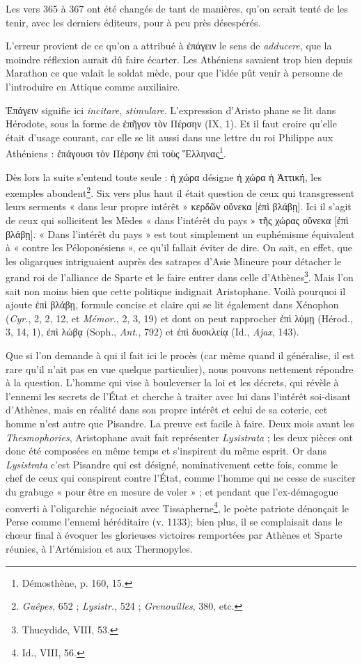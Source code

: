 \documentclass{book}%
\newcommand{\italique}[1]{\textit{#1}}%
\newcommand{\note}[1]{\footnote{#1}}
\begin{document}
Les vers 365 à 367 ont été changés de tant de manières, qu'on serait tenté de les tenir, avec les derniers éditeurs, pour à peu près désespérés. 

L'erreur provient de ce qu'on a attribué à ἐπάγειν le sens de \italique{adducere}, que la moindre réflexion aurait dû faire écarter. 
Les Athéniens savaient trop bien depuis Marathon ce que valait le soldat mède, pour que l'idée pût venir à personne de l'introduire en Attique comme auxiliaire.

Ἐπάγειν signifie ici \italique{incitare}, \italique{stimulare}. L'expression d'Aristo phane se lit dans Hérodote, sous la forme de ἐπῆγον τὸν Πέρσην (IX, 1). 
Et il faut croire qu'elle était d'usage courant, car elle se lit aussi dans une lettre du roi Philippe aux Athéniens : ἐπάγουσι τὸν Πέρσην ἐπὶ τοὺς Ἕλληνας\note{Démosthène, p. 160, 15.}. 

Dès lors la suite s'entend toute seule : ἡ χώρα désigne ἡ χώρα ἡ Ἀττική, les exemples abondent\note{\italique{Guêpes}, 652 ; \italique{Lysistr.}, 524 ; \italique{Grenouilles}, 380, etc.}. Six vers plus haut il était question de ceux qui transgressent leurs serments « dans leur propre intérêt » κερδῶν οὕνεκα [ἐπὶ βλάβῃ]. Ici il s'agit de ceux qui sollicitent les Mèdes « dans l'intérêt du pays » τῆς χώρας οὕνεκα [ἐπὶ βλάβῃ]. 
« Dans l'intérêt du pays » est tout simplement un euphémisme équivalent à « contre les Péloponésiens », ce qu'il fallait éviter de dire. 
On sait, en effet, que les oligarques intriguaient auprès des satrapes d'Asie Mineure pour détacher le grand roi de l'alliance de Sparte et le faire entrer dans celle d'Athènes\note{Thucydide, VIII, 53.}. Mais l'on sait non moins bien que cette politique indignait Aristophane. 
Voilà pourquoi il ajoute ἐπὶ βλάβῃ, formule concise et claire qui se lit également dans Xénophon (\italique{Cyr.}, 2, 2, 12, et \italique{Mémor.}, 2, 3, 19) et dont on peut rapprocher ἐπὶ λύμῃ (Hérod., 3, 14, 1), ἐπὶ λώβᾳ (Soph., \italique{Ant.}, 792) et ἐπὶ δυσκλείᾳ (Id., \italique{Ajax}, 143). 

Que si l'on demande à qui il fait ici le procès (car même quand il généralise, il est rare qu'il n'ait pas en vue quelque particulier), nous pouvons nettement répondre à la question. L'homme qui vise à bouleverser la loi et les décrets, qui révèle à l'ennemi les secrets de l'État et cherche à traiter avec lui dans l'intérêt soi-disant d'Athènes, mais en réalité dans son propre intérêt et celui de sa coterie, cet homme n'est autre que Pisandre. 
La preuve est facile à faire. Deux mois avant les \italique{Thesmophories}, Aristophane avait fait représenter \italique{Lysistrata} ; les deux pièces ont donc été composées en même temps et s'inspirent du même esprit. 
Or dans \italique{Lysistrata} c'est Pisandre qui est désigné, nominativement cette fois, comme le chef de ceux qui conspirent contre l'État, comme l'homme qui ne cesse de susciter du grabuge « pour être en mesure de voler » ; et pendant que l'ex-démagogue converti à l'oligarchie négociait avec Tissapherne\note{Id., VIII, 56.}, le poète patriote dénonçait le Perse comme l'ennemi héréditaire (v. 1133); bien plus, il se complaisait dans le chœur final à évoquer les glorieuses victoires remportées par Athènes et Sparte réunies, à l'Artémision et aux Thermopyles. 
\end{document}
